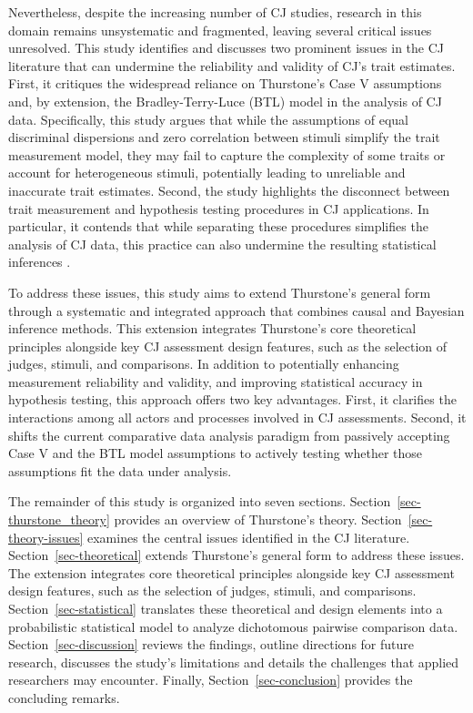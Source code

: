 \documentclass[
  authoryear,
  review,
  1p]{elsarticle}
\begin{document}
Nevertheless, despite the increasing number of CJ studies, research in
this domain remains unsystematic and fragmented, leaving several
critical issues unresolved. This study identifies and discusses two
prominent issues in the CJ literature that can undermine the reliability
and validity of CJ's trait estimates. First, it critiques the widespread
reliance on Thurstone's Case V assumptions \citep{Thurstone_1927b} and,
by extension, the Bradley-Terry-Luce (BTL) model
\citep{Bradley_et_al_1952, Luce_1959} in the analysis of CJ data.
Specifically, this study argues that while the assumptions of equal
discriminal dispersions and zero correlation between stimuli simplify
the trait measurement model, they may fail to capture the complexity of
some traits or account for heterogeneous stimuli, potentially leading to
unreliable and inaccurate trait estimates. Second, the study highlights
the disconnect between trait measurement and hypothesis testing
procedures in CJ applications. In particular, it contends that while
separating these procedures simplifies the analysis of CJ data, this
practice can also undermine the resulting statistical inferences
\citep{McElreath_2020, Kline_et_al_2023, Hoyle_et_al_2023}.

To address these issues, this study aims to extend Thurstone's general
form through a systematic and integrated approach that combines causal
and Bayesian inference methods. This extension integrates Thurstone's
core theoretical principles alongside key CJ assessment design features,
such as the selection of judges, stimuli, and comparisons. In addition
to potentially enhancing measurement reliability and validity, and
improving statistical accuracy in hypothesis testing, this approach
offers two key advantages. First, it clarifies the interactions among
all actors and processes involved in CJ assessments. Second, it shifts
the current comparative data analysis paradigm from passively accepting
Case V and the BTL model assumptions to actively testing whether those
assumptions fit the data under analysis.

The remainder of this study is organized into seven sections.
Section~\ref{sec-thurstone_theory} provides an overview of Thurstone's
theory. Section~\ref{sec-theory-issues} examines the central issues
identified in the CJ literature. Section~\ref{sec-theoretical} extends
Thurstone's general form to address these issues. The extension
integrates core theoretical principles alongside key CJ assessment
design features, such as the selection of judges, stimuli, and
comparisons. Section~\ref{sec-statistical} translates these theoretical
and design elements into a probabilistic statistical model to analyze
dichotomous pairwise comparison data. Section~\ref{sec-discussion}
reviews the findings, outline directions for future research, discusses
the study's limitations and details the challenges that applied
researchers may encounter. Finally, Section~\ref{sec-conclusion}
provides the concluding remarks.
\end{document}
